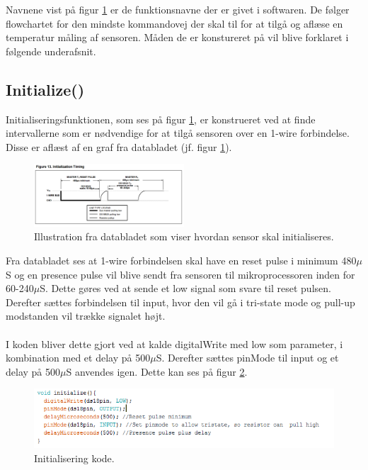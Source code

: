 Navnene vist på figur \ref{sensor_kom} er de funktionsnavne der er givet i softwaren. De følger flowchartet for den mindste kommandovej der skal til for at tilgå og aflæse en temperatur måling af sensoren. Måden de er konstureret på vil blive forklaret i følgende underafsnit.

\newpage
\subsection{Initialize()}
Initialiseringsfunktionen, som ses på figur \ref{sensor_kom}, er konstrueret ved at finde intervallerne som er nødvendige for at tilgå sensoren over en 1-wire forbindelse. Disse er aflæst af en graf fra databladet (jf. figur \ref{sensor_kom}).




\begin{figure}[h!]
  \centering
  \includegraphics[width=0.5\textwidth]{figures/Initialization_timing.png}
  \caption{Illustration fra databladet som viser hvordan sensor skal initialiseres.}
  \label{sensor_kom}
\end{figure}

Fra databladet ses at 1-wire forbindelsen skal have en reset pulse i minimum 480$\mu$S og en presence pulse vil blive sendt fra sensoren til mikroprocessoren inden for 60-240$\mu$S. Dette gøres ved at sende et low signal som svare til reset pulsen. Derefter sættes forbindelsen til input, hvor den vil gå i tri-state mode og pull-up modstanden vil trække signalet højt. 
\\
\\
I koden bliver dette gjort ved at kalde digitalWrite med low som parameter, i kombination med et delay på 500$\mu$S. Derefter sættes pinMode til input og et delay på 500$\mu$S anvendes igen. Dette kan ses på figur \ref{sensor_kode}.

\begin{figure}[h!]
  \centering
  \includegraphics[width=1\textwidth]{figures/Init.png}
  \caption{Initialisering kode.}
  \label{sensor_kode}
\end{figure}

